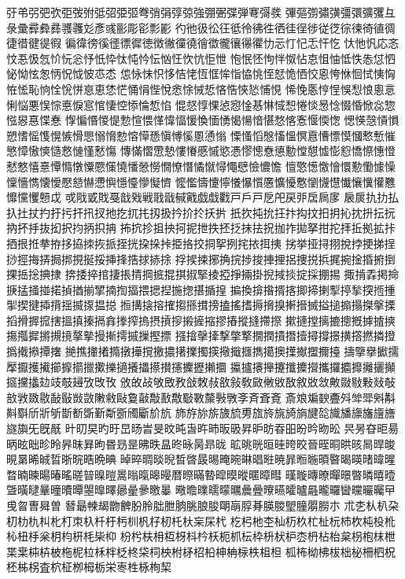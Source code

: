 弙弚弜弝弞弡弢弣弤弨弫弬弮弰弲弴弶強弸弻弽弾弿彁彂
彃彄彅彇彉彊彋彍彏彑彔彚彛彜彞彟彠彣彥彧彨彫彮彯彲
彴彵彶彸彺彽彾彿徃徆徍徎徏従徔徖徚徛徝徟徢徣徤徥徦
徧徫徬徯徰徱徲徳徴徶徸徺徻徾徿忀忁忂忇忈忊忋忎忓忔
忕忚忛応忞忟忢忣忥忦忨忩忬忯忰忲忳忴忶忷忹忺忼怇怈
怉怋怌怐怑怓怗怘怚怞怟怢怣怤怬怭怮怰怱怲怳怴怶怷怸
怹怺怽怾恀恄恅恆恇恈恉恊恌恎恏恑恓恔恖恗恘恛恜恞恟
恠恡恥恦恮恱恲恴恵恷恾悀悁悂悅悆悇悈悊悋悎悏悐悑悓
悕悗悘悙悜悞悡悢悤悥悧悩悪悮悰悳悷悹悺悽悾悿惀惁惂
惃惄惇惈惉惌惍惎惏惐惒惓惔惖惗惙惛惞惢惣惤惥惪惵惷
惸惼惽惾惿愂愃愄愅愇愊愋愌愐愑愒愓愔愖愗愘愙愝愞愡
愢愥愨愩愪愬愭愮愯愰愱愲愳愵愶愸愹愺愻愼愽慀慁慂慃
慄慅慆慇慉慍慏慐慒慓慔慖慗慙慛慜慞慠慡慥慦慩慬慭慯
慱慲慴慸慹慺慻慼慽慾慿憀憁憃憄憅憆憇憈憉憌憍憏憓憕
憖憗憘憙憛憜憞憟憠憡憢憣憥憦憪憭憯憰憱憳憴憵憸憹憺
憻憼憽憿懀懁懃懄懅懆懍懎懏懐懓懕懖懗懘懙懚懛懜懝懠
懡懢懤懥懧懩懪懫懬懭懮懯懰懱懳懴懹懻懽戁戂戃戄戅戉
戓戙戜戝戞戠戣戦戨戩戫戭戯戱戵⼾戶戸戹戺戻戼扂扄扅
扆扊扏扐払扖扗扙扚扜扝扞扟扠扡扢扤扥扨扱扲扴扵扷扸
扺扻扽抁抂抃抅抆抇抈抋抌抍抎抏抐抔抙抜抝択抣抦抧抩
抪抭抮抯抰抲抳抴抶抷抸抺抾拀拁拃拋拏拑拕拝拞拠拡拤
拪拫拰拲拵拸拹拺拻挀挃挄挅挆挊挋挌挍挏挐挒挓挔挕挗
挘挙挜挦挧挩挬挭挮挰挱挳挴挵挶挷挸挻挼挿捀捁捄捇捈
捊捑捒捓捔捖捗捘捙捚捛捜捝捠捤捥捦捪捬捯捰捳捴捵捸
捹捼捽捾捿掁掅掆掋掍掑掓掔掕掗掙掚掛掜掝掞掟採掤掦
掫掯掱掲掵掶掹掻掽掿揁揂揃揅揇揈揊揋揌揑揓揔揕揗揘
揙換揜揝揟揢揤揥揦揧揨揫揬揯揰揱揳揵揷揹揺揻揼揾搃
搄搆搇搈搉搊搎搑搒搕搖搘搙搚搝搟搢搣搤搥搧搨搩搫搮
搯搰搱搲搳搵搷搸搹搻搼搾摀摂摃摉摋摌摍摎摏摐摓摕摖
摗摙摚摛摝摠摡摢摣摤摥摦摨摪摫摬摮摰摱摲摴摵摷摼摽
摾摿撀撁撃撆撉撊撋撌撍撎撏撐撔撗撘撚撛撜撝撠撡撢撦
撧撨撪撯撱撴撶撹撽擃擆擈擉擌擏擑擓擕擖擙擛擜擝擟擡
擣擥擧擨擩擪擫擭擮擳擵擶擸擹擽擿攁攂攃攅攇攈攊攋攌
攍攎攐攑攓攕攗攚攜攞攟攠攡攦攧攨攩攭攰攱攲攳攷攺攼
攽敀敁敂敃敄敆敇敊敋敍敎敐敒敓敔敘敚敜敟敠敡敤敥敧
敨敩敪敭敮敯敱敳敶敹敺敻敼敽敾敿斀斁斄斅斆斈斉斊斍
斎斏斒斔斖斘斚斝斞斠斢斣斦斨斪斮斱斲斳斴斵斶斸斺斻
斾斿旀旂旇旈旉旊旍旐旑旓旔旕旘旙旚旛旜旝旞旟旡旣旤
旪旫旲旳旴旵旸旹旻旼旽旾旿昁昄昅昇昈昉昋昍昐昑昒昖
昗昘昚昛昜昞昡昢昣昤昦昩昪昫昬昮昰昲昳昷昸昹昺昻昽
昿晀晄晅晆晇晈晉晊晍晎晐晑晘晙晛晜晞晠晢晣晥晧晩晪
晫晬晭晱晲晳晵晸晹晻晼晽晿暀暁暃暅暆暊暋暍暎暏暐暒
暓暔暕暘暙暚暛暜暞暟暠暡暣暤暥暦暩暪暬暭暯暰暱暲暳
暵暶暷暸暺暻暼暽暿曀曁曂曃曅曈曊曋曌曍曎曏曐曑曒曓
曔曕曗曘曚曞曟曡曢曣曤曥曧曨曪曫曭曮曯曱曵曶曺曻曽
朁朂朄朅朆朇朌朎朏朑朒朓朖朘朙朚朜朞朠朡朢朣朤朥朩
朮朰朲朳朶朷朸朹朻朼朾朿杁杄杅杇杊杋杍杒杔杕杗杘杙
杚杛杝杢杣杤杦杧杫杬杮杴杶杸杹杺杻杽枀枂枃枅枆枈枊
枌枍枎枏枑枒枓枔枖枙枛枟枠枡枤枦枩枬枮枱枲枴枹枺枻
枼枽枾枿柀柂柅柆柇柈柉柊柋柌柍柎柕柖柗柛柟柡柣柤柦
柧柨柪柫柭柮柲柵柶柷柸柹柺査柼柾栁栂栃栄栆栍栐栒栔
